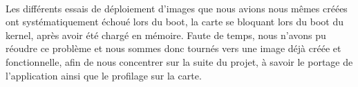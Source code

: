 \paragraph{}
Les différents essais de déploiement d'images que nous avions nous mêmes créées
ont systématiquement échoué lors du boot, la carte se bloquant lors du boot
du kernel, après avoir été chargé en mémoire. Faute de temps, nous n'avons pu
réoudre ce problème et nous sommes donc tournés vers une image déjà créée et
fonctionnelle, afin de nous concentrer sur la suite du projet, à savoir le
portage de l'application ainsi que le profilage sur la carte.
